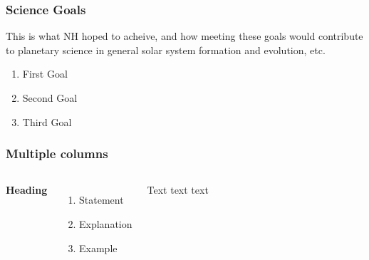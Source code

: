 \documentclass{beamer}
\begin{document}
\begin{frame}
    \frametitle{Science Goals}
    This is what NH hoped to acheive, and how meeting these goals
    would contribute to planetary science in general solar system
    formation and evolution, etc.
    \begin{enumerate}
    \item First Goal
    \item Second Goal
    \item Third Goal
    \end{enumerate}
\end{frame}


\begin{frame}
    \frametitle{Multiple columns}
    \begin{columns}[c] %
        {\textbf{Heading}}
        \begin{enumerate}
            \item Statement
            \item Explanation
            \item Example
        \end{enumerate}
            Text text text
        \end{columns}
\end{frame}
\end{document}
